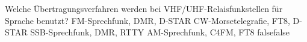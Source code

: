     {Welche Übertragungsverfahren werden bei VHF/UHF-Relaisfunkstellen für Sprache benutzt?}
    {FM-Sprechfunk, DMR, D-STAR}
    {CW-Morsetelegrafie, FT8, D-STAR}
    {SSB-Sprechfunk, DMR, RTTY}
    {AM-Sprechfunk, C4FM, FT8 }
    {false}{false}